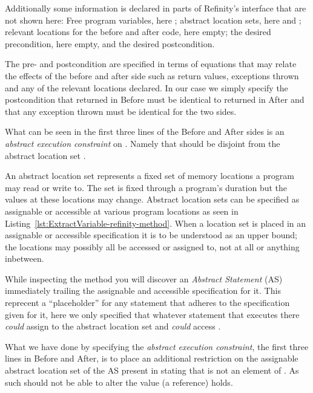 Additionally some information is declared in parts of Refinity's interface that are not shown here:
Free program variables, here ; abstract location sets, here  and ; relevant locations for the before and after code, here empty;
the desired precondition, here empty, and the desired postcondition.

The pre- and postcondition are specified in terms of equations that may relate the effects of the before and after side such as return values, exceptions thrown and any
of the relevant locations declared.
In our case we simply specify the postcondition that  returned in Before must be identical to  returned in After and that any exception thrown must be identical for the two sides.

What can be seen in the first three lines of the Before and After sides is an \emph{abstract execution constraint} on .
Namely that  should be disjoint from the abstract location set .

An abstract location set represents a fixed set of memory locations a program may read or write to. The set is fixed through a program's duration but the values at these locations may change.
Abstract location sets can be specified as assignable or accessible at various program locations as seen in Listing~\ref{lst:ExtractVariable-refinity-method}.
When a location set is placed in an assignable or accessible specification it is to be understood as an upper bound; the locations may possibly all be accessed or assigned to, not at all or
anything inbetween.

While inspecting the method  you will discover an \emph{Abstract Statement} (AS)  immediately trailing the assignable and accessible specification for it.
This reprecent a ``placeholder'' for any statement that adheres to the specification given for it, here we only specified that whatever statement that executes there \emph{could} assign to the abstract
location set  and \emph{could} access .

What we have done by specifying the \emph{abstract execution constraint}, the first three lines in Before and After, is to place an additional restriction on the assignable abstract
location set  of the AS present in  stating that  is not an element of . As such  should not be able to alter the value (a reference)
 holds.


